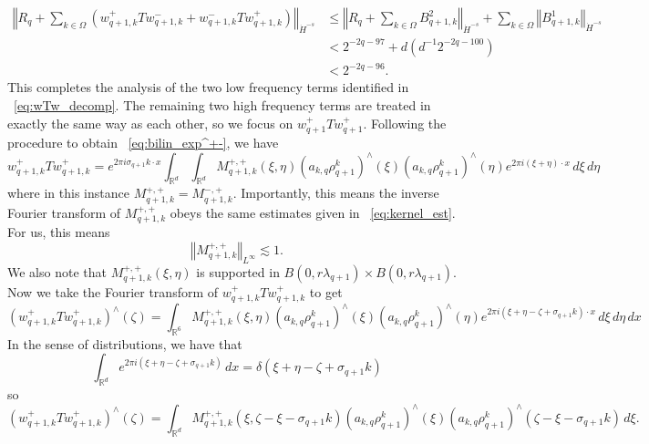 \documentclass[12pt,reqno,letterpaper]{amsart}
\numberwithin{equation}{section}
\newcommand{\1}{{\bf 1}}
\newcommand{\2}{{\bf 2}}
\newcommand{\R}{\mathbb R}
\theoremstyle{remark}
\theoremstyle{remark}
\begin{document}
\begin{equation}\label{eq:low_freq_est}
    \begin{split}
        \left\Vert  R_q + \sum_{k \in \Omega} \left(w_{q+1,k}^+ Tw_{q+1,k}^- + w_{q+1,k}^- Tw_{q+1,k}^+\right) \right\Vert_{\dot{H}^{-s}} &\leq \left\Vert R_q + \sum_{k \in \Omega} B^2_{q+1,k} \right\Vert_{\dot{H}^{-s}} + \sum_{k \in \Omega} \left\Vert B^1_{q+1,k}\right\Vert_{\dot{H}^{-s}}\\
        &< 2^{-2q-97} + d\left(d^{-1}2^{-2q-100}\right)\\
        &< 2^{-2q-96}.
    \end{split}
\end{equation}
This completes the analysis of the two low frequency terms identified in ~\eqref{eq:wTw_decomp}. The remaining two high frequency terms are treated in exactly the same way as each other, so we focus on $w_{q+1}^+ Tw_{q+1}^+$. Following the procedure to obtain ~\eqref{eq:bilin_exp^+-}, we have
\begin{equation}
    w_{q+1,k}^+ Tw_{q+1,k}^+ = e^{2\pi i \sigma_{q+1}k \cdot x}\int_{\R^d} \int_{\R^d} M^{+,+}_{q+1,k}(\xi,\eta) \left(a_{k,q} \rho^k_{q+1}\right)^{\wedge}(\xi) \left(a_{k,q} \rho^k_{q+1}\right)^{\wedge}(\eta) e^{2\pi i (\xi + \eta) \cdot x}\, d\xi\, d\eta
\end{equation}
where in this instance $M_{q+1,k}^{+,+} = M_{q+1,k}^{-,+}$. Importantly, this means the inverse Fourier transform of $M_{q+1,k}^{+,+}$ obeys the same estimates given in ~\eqref{eq:kernel_est}. For us, this means
$$
\left\Vert M_{q+1,k}^{+,+} \right\Vert_{L^\infty} \lesssim 1.
$$
We also note that $M_{q+1,k}^{+,+}(\xi,\eta)$ is supported in $B(0,r\lambda_{q+1}) \times B(0,r\lambda_{q+1})$. Now we take the Fourier transform of $w_{q+1,k}^+ Tw_{q+1,k}^+$ to get
\begin{equation*}
    \left(w_{q+1,k}^+Tw_{q+1,k}^+\right)^\wedge(\zeta) = \int_{\R^6} M_{q+1,k}^{+,+}(\xi,\eta) \left(a_{k,q} \rho^k_{q+1}\right)^{\wedge}(\xi) \left(a_{k,q} \rho^k_{q+1}\right)^{\wedge}(\eta) e^{2\pi i (\xi + \eta -\zeta + \sigma_{q+1}k) \cdot x}\, d\xi\, d\eta\, dx
\end{equation*}
In the sense of distributions, we have that
$$
\int_{\R^d} e^{2\pi i (\xi + \eta -\zeta + \sigma_{q+1}k)}\, dx = \delta(\xi + \eta - \zeta + \sigma_{q+1}k)
$$
so
$$
\left(w_{q+1,k}^+Tw_{q+1,k}^+\right)^\wedge(\zeta) = \int_{\R^d} M_{q+1,k}^{+,+}(\xi,\zeta - \xi - \sigma_{q+1}k) \left(a_{k,q} \rho^k_{q+1}\right)^{\wedge}(\xi) \left(a_{k,q} \rho^k_{q+1}\right)^{\wedge}(\zeta - \xi - \sigma_{q+1}k)\, d\xi.
$$
\end{document}
